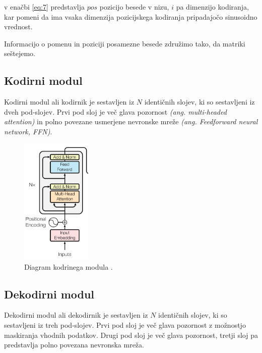 \documentclass[a4paper,12pt,openright]{book}
\begin{document}
v enačbi \ref{eq:7} predstavlja $ pos $ pozicijo besede v nizu, $ i $ pa dimenzijo kodiranja, kar pomeni da ima vsaka dimenzija pozicijskega kodiranja pripadajočo sinusoidno vrednost.


Informacijo o pomenu in poziciji posamezne besede združimo tako, da matriki seštejemo.

\subsection{Kodirni modul}
Kodirni modul ali kodirnik je sestavljen iz $ N $ identičnih slojev, ki so sestavljeni iz dveh pod-slojev. Prvi pod sloj je več glava pozornost \emph{(ang. multi-headed attention)} in polno povezane usmerjene nevronske mreže \emph{(ang. Feedforward neural network, FFN)}.

\begin{figure}[htb]
    \begin{center}
        \includegraphics[width=0.3\textwidth]{img/encoder.png}
    \end{center}
    \caption{Diagram kodrinega modula \cite{attention_is_all_you_need}.}
    \label{img:encoder}
\end{figure}


\subsection{Dekodirni modul}
Dekodirni modul ali dekodirnik je sestavljen iz $ N $ identičnih slojev, ki so sestavljeni iz treh pod-slojev. Prvi pod sloj je več glava pozornost z možnostjo maskiranja vhodnih podatkov. Drugi pod sloj je več glava pozornost, tretji sloj pa predstavlja polno povezana nevronska mreža.
\end{document}
